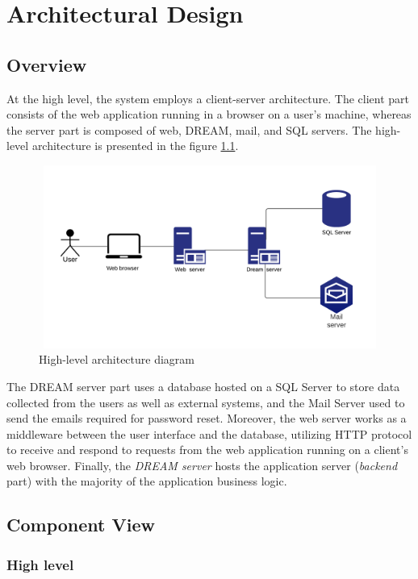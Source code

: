 \chapter{Architectural Design} \label{ch:architectural_design}


\section{Overview}
 At the high level, the system employs a client-server architecture. The client part consists of the web application running in a browser on a user's machine, whereas the server part is composed of web, DREAM, mail, and SQL servers. The high-level architecture is presented in the figure \ref{fig:high-level-architecture}.

\begin{figure}[H]
    \centering
    \includegraphics[width=12cm, height=6cm]
    {figures/Overview.png}
    \caption{High-level architecture diagram}
    \label{fig:high-level-architecture}
\end{figure}

The DREAM server part uses a database hosted on a SQL Server to store data collected from the users as well as external systems, and the Mail Server used to send the emails required for password reset. Moreover, the web server works as a middleware between the user interface and the database, utilizing HTTP protocol to receive and respond to requests from the web application running on a client's web browser. Finally, the \textit{DREAM server} hosts the application server (\textit{backend} part) with the majority of the application business logic. 

\section{Component View}

\subsection{High level}

